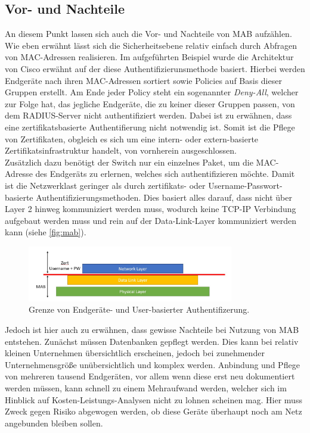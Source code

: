 \documentclass[conference]{IEEEtran}
\begin{document}
%

\vspace{.5em}
\subsection{Vor- und Nachteile}

An diesem Punkt lassen sich auch die Vor- und Nachteile von MAB aufzählen. Wie eben erwähnt lässt sich die Sicherheitsebene relativ einfach durch Abfragen von MAC-Adressen realisieren. Im aufgeführten Beispiel wurde die Architektur von Cisco erwähnt auf der diese Authentifizierunsmethode basiert. Hierbei werden Endgeräte nach ihren MAC-Adressen sortiert sowie Policies auf Basis dieser Gruppen erstellt. Am Ende jeder Policy steht ein sogenannter \emph{Deny-All}, welcher zur Folge hat, das jegliche Endgeräte, die zu keiner dieser Gruppen passen, von dem RADIUS-Server nicht authentifiziert werden. Dabei ist zu erwähnen, dass eine zertifikatsbasierte Authentifierung nicht notwendig ist. Somit ist die Pflege von Zertifikaten, obgleich es sich um eine intern- oder extern-basierte Zertifikatsinfrastruktur handelt, von vornherein ausgeschlossen.\\

Zusätzlich dazu benötigt der Switch nur ein einzelnes Paket, um die MAC-Adresse des Endgeräts zu erlernen, welches sich authentifizieren möchte. Damit ist die Netzwerklast geringer als durch zertifikats- oder Username-Passwort-basierte Authentifizierungsmethoden. Dies basiert alles darauf, dass nicht über Layer 2 hinweg kommuniziert werden muss, wodurch keine TCP-IP Verbindung aufgebaut werden muss und rein auf der Data-Link-Layer kommuniziert werden kann (siehe \autoref{fig:mab}).\\

\begin{figure}[hbt]
	\centering
	\includegraphics[width=9cm]{figures/MAB_Layer_2.jpg}
	\caption{Grenze von Endgeräte- und User-basierter Authentifizerung.}
	\label{fig:mab}
\end{figure}

Jedoch ist hier auch zu erwähnen, dass gewisse Nachteile bei Nutzung von MAB entstehen. Zunächst müssen Datenbanken gepflegt werden. Dies kann bei relativ kleinen Unternehmen übersichtlich erscheinen, jedoch bei zunehmender Unternehmensgröße unübersichtlich und komplex werden. Anbindung und Pflege von mehreren tausend Endgeräten, vor allem wenn diese erst neu dokumentiert werden müssen, kann schnell zu einem Mehraufwand werden, welcher sich im Hinblick auf Kosten-Leistungs-Analysen nicht zu lohnen scheinen mag. Hier muss Zweck gegen Risiko abgewogen werden, ob diese Geräte überhaupt noch am Netz angebunden bleiben sollen.\\
\end{document}
